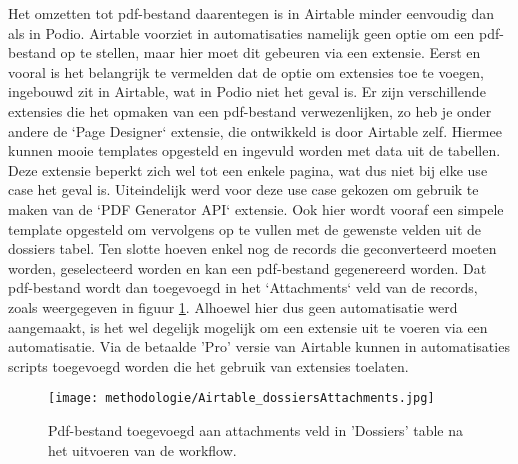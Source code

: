 Het omzetten tot pdf-bestand daarentegen is in Airtable minder eenvoudig dan als in Podio. Airtable voorziet in automatisaties namelijk geen optie om een pdf-bestand op te stellen, maar hier moet dit gebeuren via een extensie. Eerst en vooral is het belangrijk te vermelden dat de optie om extensies toe te voegen, ingebouwd zit in Airtable, wat in Podio niet het geval is. Er zijn verschillende extensies die het opmaken van een pdf-bestand verwezenlijken, zo heb je onder andere de `Page Designer` extensie, die ontwikkeld is door Airtable zelf. Hiermee kunnen mooie templates opgesteld en ingevuld worden met data uit de tabellen. Deze extensie beperkt zich wel tot een enkele pagina, wat dus niet bij elke use case het geval is. Uiteindelijk werd voor deze use case gekozen om gebruik te maken van de `PDF Generator API` extensie. Ook hier wordt vooraf een simpele template opgesteld om vervolgens op te vullen met de gewenste velden uit de dossiers tabel. Ten slotte hoeven enkel nog de records die geconverteerd moeten worden, geselecteerd worden en kan een pdf-bestand gegenereerd worden. Dat pdf-bestand wordt dan toegevoegd in het `Attachments` veld van de records, zoals weergegeven in figuur \ref{fig:meth_airtable_dossiersAttachments}. Alhoewel hier dus geen automatisatie werd aangemaakt, is het wel degelijk mogelijk om een extensie uit te voeren via een automatisatie. Via de betaalde 'Pro' versie van Airtable kunnen in automatisaties scripts toegevoegd worden die het gebruik van extensies toelaten.  \\

\begin{figure}[h]
    \centering
    \texttt{[image: methodologie/Airtable\_dossiersAttachments.jpg]}
    \caption{Pdf-bestand toegevoegd aan attachments veld in 'Dossiers' table na het uitvoeren van de workflow.}
    \label{fig:meth_airtable_dossiersAttachments}
\end{figure}

